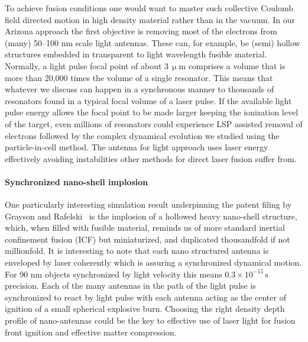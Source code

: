 \documentclass[particles,article,accept,pdftex,moreauthors]{Definitions/mdpi}
\begin{document}
To achieve fusion conditions one would want to master such collective Coulomb field directed motion in high density material rather than in the vacuum. In our Arizona approach the first objective is removing most of the electrons from (many) 50--100 nm scale light antennas. These can, for example, be (semi) hollow structures embedded in transparent to light wavelength fusible material. Normally, a light pulse focal point of about 3\,$\upmu $m comprises a volume that is more than 20,000 times the volume of a single resonator. This means that whatever we discuss can happen in a synchronous manner to thousands of resonators found in a typical focal volume of a laser pulse. If the available light pulse energy allows the focal point to be made larger keeping the ionization level of the target, even millions of resonators could experience LSP assisted removal of electrons followed by the complex dynamical evolution we studied using the particle-in-cell method. The antenna for light approach uses laser energy effectively avoiding instabilities other methods for direct laser fusion suffer from. 

\paragraph*{\bf Synchronized nano-shell implosion}
One particularly interesting simulation result underpinning the patent filing by Grayson and Rafelski~\cite{ChGJR2025patent} is the implosion of a hollowed heavy nano-shell structure, which, when filled with fusible material, reminds us of more standard inertial confinement fusion (ICF) but miniaturized, and duplicated thousandfold if not millionfold. It is interesting to note that each nano structured antenna is enveloped by laser coherently which is assuring a synchronized dynamical motion. For 90 nm objects synchronized by light velocity this means $ 0.3\times 10^{-15}\,\mathrm{s}$ precision. Each of the many antennas in the path of the light pulse is synchronized to react by light pulse with each antenna acting as the center of ignition of a small spherical explosive burn. Choosing the right density depth profile of nano-antennas could be the key to effective use of laser light for fusion front ignition and effective matter compression.
\end{document}
